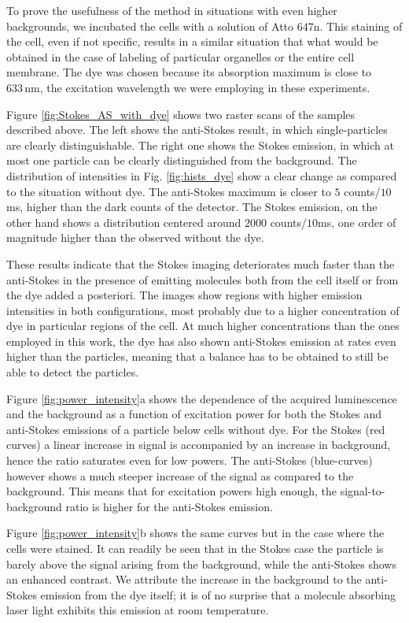 \documentclass[journal=nalefd,manuscript=letter]{achemso}
\newcommand{\nm}{\ensuremath{\,\textrm{nm}}}
\begin{document}
To prove the usefulness of the method in situations with even higher
backgrounds, we incubated the cells with a solution of Atto 647n. This staining
of the cell, even if not specific, results in a similar situation that what
would be obtained in the case of labeling of particular organelles or the entire
cell membrane. The dye was chosen because its absorption maximum is close to
$633\nm$, the excitation wavelength we were employing in these experiments. 

Figure \ref{fig:Stokes_AS_with_dye} shows two raster scans of the samples
described above. The left shows the anti-Stokes result, in which
single-particles are clearly distinguishable. The right one shows the Stokes
emission, in which at most one particle can be clearly distinguished from the
background. The distribution of intensities in Fig. \ref{fig:hists_dye}
show a clear change as compared to the situation without dye. The anti-Stokes
maximum is closer to $5$ counts/$10$ms, higher than the dark counts of the
detector. The Stokes emission, on the other hand shows a distribution centered
around $2000$ counts/$10$ms, one order of magnitude higher than the observed
without the dye. 

These results indicate that the Stokes imaging deteriorates much faster than the
anti-Stokes in the presence of emitting molecules both from the cell itself or
from the dye added a posteriori. The images show regions with higher emission
intensities in both configurations, most probably due to a higher concentration
of dye in particular regions of the cell. At much higher concentrations than
the ones employed in this work, the dye has also shown anti-Stokes emission at
rates even higher than the particles, meaning that a balance has to be obtained
to still be able to detect the particles.

Figure \ref{fig:power_intensity}a shows the dependence of the acquired
luminescence and the background as a function of excitation power for both the
Stokes and anti-Stokes emissions of a particle below cells without dye. For the
Stokes (red curves) a linear increase in signal is accompanied by an increase in
background, hence the ratio saturates even for low powers. The anti-Stokes
(blue-curves) however shows a much steeper increase of the signal as compared to
the background. This means that for excitation powers high enough, the
signal-to-background ratio is higher for the anti-Stokes emission.

Figure \ref{fig:power_intensity}b shows the same curves but in the case where
the cells were stained. It can readily be seen that in the Stokes case the
particle is barely above the signal arising from the background, while the
anti-Stokes shows an enhanced contrast. We attribute the increase in the
background to the anti-Stokes emission from the dye itself; it is of no surprise
that a molecule absorbing laser light exhibits this emission at room
temperature. 
\end{document}
